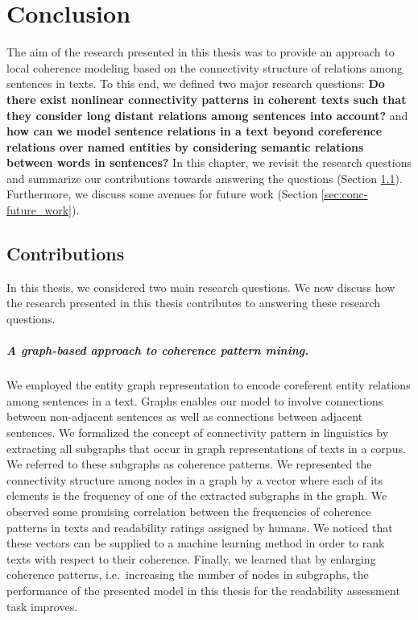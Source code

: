 
\chapter{Conclusion} 
\label{ch:conc} 
The aim of the research presented in this thesis was to provide an approach to local coherence modeling based on the connectivity structure of relations among sentences in  texts. 
To this end, we defined two major research questions: \textbf{Do there exist nonlinear connectivity patterns in coherent texts such that they consider long distant relations among sentences into account?} and \textbf{how can we model sentence relations in a text beyond coreference relations over named entities by considering semantic relations between words in sentences?} 
In this chapter, we revisit the research questions and summarize our contributions towards answering the questions (Section \ref{sec:conc-contributions}). 
Furthermore, we discuss some avenues for future work (Section \ref{sec:conc-future_work}).

\section{Contributions}
\label{sec:conc-contributions}


In this thesis, we considered two main research questions. 
We now discuss how the research presented in this thesis contributes to answering these research questions.

\paragraph{A graph-based approach to coherence pattern mining.} 
We employed the entity graph representation to encode coreferent entity relations among sentences in a text. 
Graphs enables our model to involve connections between non-adjacent sentences as well as connections between adjacent sentences. 
We formalized the concept of connectivity pattern in linguistics \cite{danes74a,stoddard91} by extracting all subgraphs that occur in graph representations of texts in a corpus. 
We referred to these subgraphs as coherence patterns. 
We represented the connectivity structure among nodes in a graph by a vector where each of its elements is the frequency of one of the extracted subgraphs in the graph. 
We observed some promising correlation between the frequencies of coherence patterns in texts and  readability ratings assigned by humans. 
We noticed that these vectors can be supplied to a machine learning method in order to rank texts with respect to their coherence. 
Finally, we learned that by enlarging coherence patterns, i.e.\ increasing the number of nodes in subgraphs, the performance of the presented model in this thesis for the readability assessment task improves. 


